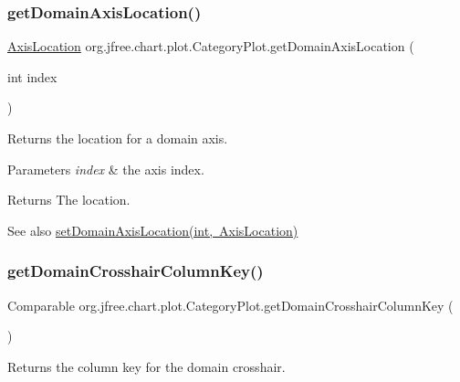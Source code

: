 \subsubsection{\texorpdfstring{get\+Domain\+Axis\+Location()}{getDomainAxisLocation()}\hspace{0.1cm}{\footnotesize\ttfamily [2/2]}}
{\footnotesize\ttfamily \mbox{\hyperlink{classorg_1_1jfree_1_1chart_1_1axis_1_1_axis_location}{Axis\+Location}} org.\+jfree.\+chart.\+plot.\+Category\+Plot.\+get\+Domain\+Axis\+Location (\begin{DoxyParamCaption}\item[{int}]{index }\end{DoxyParamCaption})}

Returns the location for a domain axis.


\begin{DoxyParams}{Parameters}
{\em index} & the axis index.\\
\hline
\end{DoxyParams}
\begin{DoxyReturn}{Returns}
The location.
\end{DoxyReturn}
\begin{DoxySeeAlso}{See also}
\mbox{\hyperlink{classorg_1_1jfree_1_1chart_1_1plot_1_1_category_plot_a63be5f2040ea560e408c89c2e2dd7b3b}{set\+Domain\+Axis\+Location(int, Axis\+Location)}} 
\end{DoxySeeAlso}
\mbox{\label{classorg_1_1jfree_1_1chart_1_1plot_1_1_category_plot_aa65be33106869b4e0d40960b84bb110e}} 
\subsubsection{\texorpdfstring{get\+Domain\+Crosshair\+Column\+Key()}{getDomainCrosshairColumnKey()}}
{\footnotesize\ttfamily Comparable org.\+jfree.\+chart.\+plot.\+Category\+Plot.\+get\+Domain\+Crosshair\+Column\+Key (\begin{DoxyParamCaption}{ }\end{DoxyParamCaption})}

Returns the column key for the domain crosshair.

